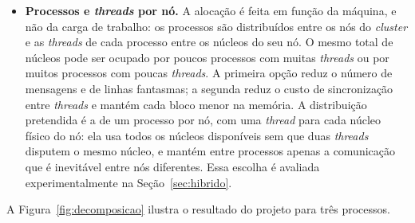 \documentclass[11pt,a4paper]{article}
\begin{document}
\begin{itemize}
    \item \textbf{Processos e \emph{threads} por nó.} A alocação é feita em função da máquina, e não da carga de trabalho: os processos são distribuídos entre os nós do \emph{cluster} e as \emph{threads} de cada processo entre os núcleos do seu nó. O mesmo total de núcleos pode ser ocupado por poucos processos com muitas \emph{threads} ou por muitos processos com poucas \emph{threads}. A primeira opção reduz o número de mensagens e de linhas fantasmas; a segunda reduz o custo de sincronização entre \emph{threads} e mantém cada bloco menor na memória. A distribuição pretendida é a de um processo por nó, com uma \emph{thread} para cada núcleo físico do nó: ela usa todos os núcleos disponíveis sem que duas \emph{threads} disputem o mesmo núcleo, e mantém entre processos apenas a comunicação que é inevitável entre nós diferentes. Essa escolha é avaliada experimentalmente na Seção~\ref{sec:hibrido}.
\end{itemize}

A Figura~\ref{fig:decomposicao} ilustra o resultado do projeto para três processos.
\end{document}
